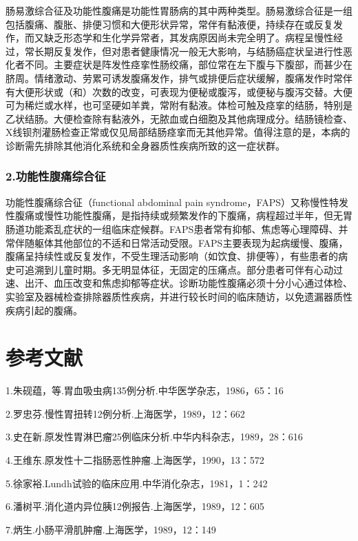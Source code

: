 肠易激综合征及功能性腹痛是功能性胃肠病的其中两种类型。肠易激综合征是一组包括腹痛、腹胀、排便习惯和大便形状异常，常伴有黏液便，持续存在或反复发作，而又缺乏形态学和生化学异常者，其发病原因尚未完全明了。病程呈慢性经过，常长期反复发作，但对患者健康情况一般无大影响，与结肠癌症状呈进行性恶化者不同。主要症状是阵发性痉挛性肠绞痛，部位常在左下腹与下腹部，而甚少在脐周。情绪激动、劳累可诱发腹痛发作，排气或排便后症状缓解，腹痛发作时常伴有大便形状或（和）次数的改变，可表现为便秘或腹泻，或便秘与腹泻交替。大便可为稀烂或水样，也可坚硬如羊粪，常附有黏液。体检可触及痉挛的结肠，特别是乙状结肠。大便检查除有黏液外，无脓血或白细胞及其他病理成分。结肠镜检查、X线钡剂灌肠检查正常或仅见局部结肠痉挛而无其他异常。值得注意的是，本病的诊断需先排除其他消化系统和全身器质性疾病所致的这一症状群。

\subsubsection{2.功能性腹痛综合征}

功能性腹痛综合征（functional abdominal pain
syndrome，FAPS）又称慢性特发性腹痛或慢性功能性腹痛，是指持续或频繁发作的下腹痛，病程超过半年，但无胃肠道功能紊乱症状的一组临床症候群。FAPS患者常有抑郁、焦虑等心理障碍、并常伴随躯体其他部位的不适和日常活动受限。FAPS主要表现为起病缓慢、腹痛，腹痛呈持续性或反复发作，不受生理活动影响（如饮食、排便等），有些患者的病史可追溯到儿童时期。多无明显体征，无固定的压痛点。部分患者可伴有心动过速、出汗、血压改变和焦虑抑郁等症状。诊断功能性腹痛必须十分小心通过体检、实验室及器械检查排除器质性疾病，并进行较长时间的临床随访，以免遗漏器质性疾病引起的腹痛。

\protect\hypertarget{text00211.html}{}{}

\section{参考文献}

1.朱砚蕴，等.胃血吸虫病135例分析.中华医学杂志，1986，65：16

2.罗忠芬.慢性胃扭转12例分析.上海医学，1989，12：662

3.史在新.原发性胃淋巴瘤25例临床分析.中华内科杂志，1989，28：616

4.王维东.原发性十二指肠恶性肿瘤.上海医学，1990，13：572

5.徐家裕.Lundh试验的临床应用.中华消化杂志，1981，1：242

6.潘树平.消化道内异位胰12例报告.上海医学，1989，12：605

7.炳生.小肠平滑肌肿瘤.上海医学，1989，12：149

